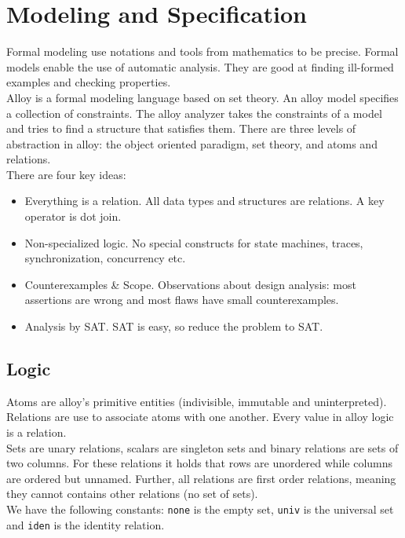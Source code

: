\section{Modeling and Specification}

Formal modeling use notations and tools from mathematics to be precise. Formal models enable the use of automatic analysis. They are good at finding ill-formed examples and checking properties. \\

Alloy is a formal modeling language based on set theory. An alloy model specifies a collection of constraints. The alloy analyzer takes the constraints of a model and tries to find a structure that satisfies them. There are three levels of abstraction in alloy: the object oriented paradigm, set theory, and atoms and relations.\\

There are four key ideas:
\begin{itemize}
	\item Everything is a relation. All data types and structures are relations. A key operator is dot join.
	\item Non-specialized logic. No special constructs for state machines, traces, synchronization, concurrency etc.
	\item Counterexamples \& Scope. Observations about design analysis: most assertions are wrong and most flaws have small counterexamples.
	\item Analysis by SAT. SAT is easy, so reduce the problem to SAT.
\end{itemize}


\subsection{Logic}

Atoms are alloy's primitive entities (indivisible, immutable and uninterpreted). Relations are use to associate atoms with one another. Every value in alloy logic is a relation.\\

Sets are unary relations, scalars are singleton sets and binary relations are sets of two columns. For these relations it holds that rows are unordered while columns are ordered but unnamed. Further, all relations are first order relations, meaning they cannot contains other relations (no set of sets).\\

We have the following constants: \texttt{none} is the empty set, \texttt{univ} is the universal set and \texttt{iden} is the identity relation.

